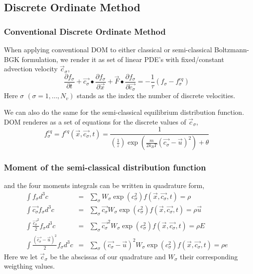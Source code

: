\subsection{Discrete Ordinate Method}
\begin{frame}
	\frametitle{Conventional Discrete Ordinate Method}
	When applying conventional DOM to either classical or semi-classical Boltzmann-BGK formulation, we render it as set of linear PDE's with fixed/constant advection velocity $\vec{c}_\sigma$,
	\begin{equation}
	\frac{\partial{f_\sigma}}{\partial{t}} +
	\vec{c_\sigma}\bullet\frac{\partial{f_\sigma}}{\partial{\vec{x}}} +
	\vec{F}\bullet\frac{\partial{f_\sigma}}{\partial{\vec{c_\sigma}}} = 
	-\frac{1}{\tau}(f_\sigma-f^{eq}_\sigma)
	\end{equation}
Here $\sigma$ $(\sigma = 1,\dots,N_v)$ stands as the index the number of discrete velocities. 
\end{frame}

\begin{frame}
We can also do the same for the semi-classical equilibrium distribution function. DOM renderes as a set of equations for the discrete values of $\vec{c}_\sigma$,
	\begin{equation}
	f_\sigma^{eq}=f^{eq}(\vec{x},\vec{c_\sigma},t)=\frac{1}{(\frac{1}{z})\exp\left({\frac{m}{2 k_B T}(\vec{c_\sigma}-\vec{u})^2}\right)+\theta}
	\end{equation}
\end{frame}

\begin{frame}
	\frametitle{Moment of the semi-classical distribution function}
	and the four moments integrals can be written in quadrature form, 
	\begin{eqnarray}
	\int f_\sigma d^3 c &=& \sum_\sigma W_\sigma \exp{(c_\sigma^2)} f(\vec{x},\vec{c_\sigma},t) = \rho \\
	\int \vec{c_\sigma} f_\sigma d^3 c &=& \sum_\sigma \vec{c_\sigma} W_\sigma \exp{(c_\sigma^2)} f(\vec{x},\vec{c_\sigma},t) = \rho \vec{u} \nonumber \\
	\int \frac{\vec{c_\sigma}^2}{2} f_\sigma d^3 c &=& \sum_\sigma \vec{c_\sigma}^2 W_\sigma \exp{(c_\sigma^2)} f(\vec{x},\vec{c_\sigma},t) = \rho E \nonumber \\
	\int \frac{(\vec{c_\sigma}-\vec{u})^2}{2} f_\sigma d^3 c &=& \sum_\sigma (\vec{c_\sigma}-\vec{u})^2 W_\sigma \exp{(c_\sigma^2)} f(\vec{x},\vec{c_\sigma},t) = \rho e \nonumber
	\end{eqnarray}
	Here we let $\vec{c}_\sigma$ be the abscissas of our quadrature and $W_\sigma$ their corresponding weigthing values. 
\end{frame} 

